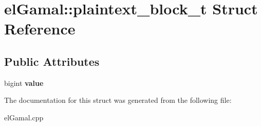 \hypertarget{structelGamal_1_1plaintext__block__t}{}\section{el\+Gamal\+:\+:plaintext\+\_\+block\+\_\+t Struct Reference}
\label{structelGamal_1_1plaintext__block__t}
\subsection*{Public Attributes}
\begin{DoxyCompactItemize}
\item 
\mbox{\label{structelGamal_1_1plaintext__block__t_a729423dfb10a498b9e5f078db42ea436}} 
bigint {\bfseries value}
\end{DoxyCompactItemize}


The documentation for this struct was generated from the following file\+:\begin{DoxyCompactItemize}
\item 
el\+Gamal.\+cpp\end{DoxyCompactItemize}
